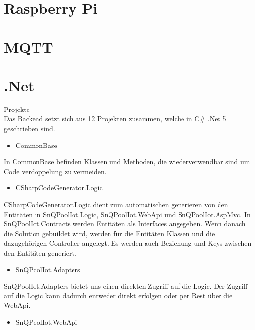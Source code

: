 \section{Raspberry Pi}



\section{MQTT}


\section{.Net}

Projekte\\

Das Backend setzt sich aus 12 Projekten zusammen, welche in C\# .Net 5 geschrieben sind.

\begin{itemize}
    \item CommonBase
\end{itemize}

In CommonBase befinden Klassen und Methoden, die wiederverwendbar sind um Code verdoppelung zu vermeiden.

\begin{itemize}
    \item CSharpCodeGenerator.Logic
\end{itemize}

CSharpCodeGenerator.Logic dient zum automatischen generieren von den Entitäten 
in SnQPoolIot.Logic, SnQPoolIot.WebApi und SnQPoolIot.AspMvc.
In SnQPoolIot.Contracts werden Entitäten als Interfaces angegeben.
Wenn danach die Solution gebuildet wird, werden für die Entitäten Klassen und die dazugehörigen Controller angelegt.
Es werden auch Beziehung und Keys zwischen den Entitäten generiert.


\begin{itemize}
    \item SnQPoolIot.Adapters
\end{itemize}

SnQPoolIot.Adapters bietet uns einen direkten Zugriff auf die Logic.
Der Zugriff auf die Logic kann dadurch entweder direkt erfolgen oder per Rest über die WebApi.

\begin{itemize}
    \item SnQPoolIot.WebApi
\end{itemize}

